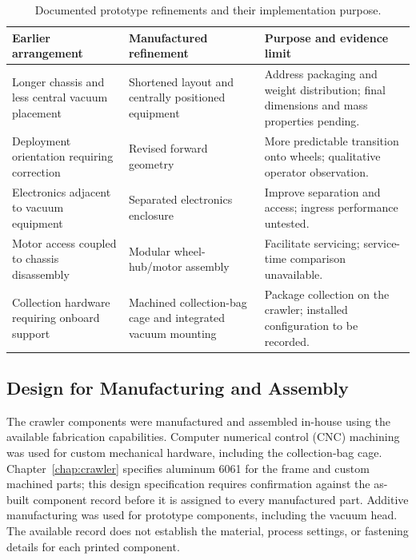 \begin{table}[htbp]\centering
\caption{Documented prototype refinements and their implementation purpose.}
\label{tab:prototype-refinements}
\begingroup\small\singlespacing\renewcommand{\arraystretch}{1.2}
\begin{tabularx}{\textwidth}{@{}XXX@{}}\toprule
Earlier arrangement & Manufactured refinement & Purpose and evidence limit \\\midrule
Longer chassis and less central vacuum placement & Shortened layout and centrally positioned equipment & Address packaging and weight distribution; final dimensions and mass properties pending. \\
Deployment orientation requiring correction & Revised forward geometry & More predictable transition onto wheels; qualitative operator observation. \\
Electronics adjacent to vacuum equipment & Separated electronics enclosure & Improve separation and access; ingress performance untested. \\
Motor access coupled to chassis disassembly & Modular wheel-hub/motor assembly & Facilitate servicing; service-time comparison unavailable. \\
Collection hardware requiring onboard support & Machined collection-bag cage and integrated vacuum mounting & Package collection on the crawler; installed configuration to be recorded. \\
\bottomrule\end{tabularx}\endgroup
\end{table}


\subsection{Design for Manufacturing and Assembly}
\label{sec:prototype-manufacturing}
The crawler components were manufactured and assembled in-house using the available fabrication capabilities. Computer numerical control (CNC) machining was used for custom mechanical hardware, including the collection-bag cage. Chapter~\ref{chap:crawler} specifies aluminum 6061 for the frame and custom machined parts; this design specification requires confirmation against the as-built component record before it is assigned to every manufactured part. Additive manufacturing was used for prototype components, including the vacuum head. The available record does not establish the material, process settings, or fastening details for each printed component.

